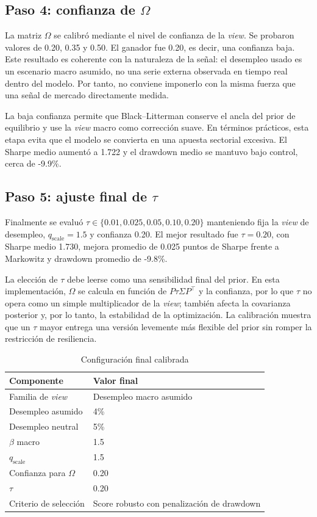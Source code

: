 \documentclass[11pt]{article}
\begin{document}
\subsection{Paso 4: confianza de $\Omega$}

La matriz $\Omega$ se calibr\'o mediante el nivel de confianza de la \textit{view}. Se probaron valores de 0.20, 0.35 y 0.50. El ganador fue 0.20, es decir, una confianza baja. Este resultado es coherente con la naturaleza de la se\~nal: el desempleo usado es un escenario macro asumido, no una serie externa observada en tiempo real dentro del modelo. Por tanto, no conviene imponerlo con la misma fuerza que una se\~nal de mercado directamente medida.

La baja confianza permite que Black--Litterman conserve el ancla del prior de equilibrio y use la \textit{view} macro como correcci\'on suave. En t\'erminos pr\'acticos, esta etapa evita que el modelo se convierta en una apuesta sectorial excesiva. El Sharpe medio aument\'o a 1.722 y el drawdown medio se mantuvo bajo control, cerca de -9.9\%.

\subsection{Paso 5: ajuste final de $\tau$}

Finalmente se evalu\'o $\tau \in \{0.01,0.025,0.05,0.10,0.20\}$ manteniendo fija la \textit{view} de desempleo, $q_{\text{scale}}=1.5$ y confianza 0.20. El mejor resultado fue $\tau=0.20$, con Sharpe medio 1.730, mejora promedio de 0.025 puntos de Sharpe frente a Markowitz y drawdown promedio de -9.8\%.

La elecci\'on de $\tau$ debe leerse como una sensibilidad final del prior. En esta implementaci\'on, $\Omega$ se calcula en funci\'on de $P\tau\Sigma P^\top$ y la confianza, por lo que $\tau$ no opera como un simple multiplicador de la \textit{view}; tambi\'en afecta la covarianza posterior y, por lo tanto, la estabilidad de la optimizaci\'on. La calibraci\'on muestra que un $\tau$ mayor entrega una versi\'on levemente m\'as flexible del prior sin romper la restricci\'on de resiliencia.

\begin{table}[H]
\centering
\caption{Configuraci\'on final calibrada}
\label{tab:config_final}
\begin{tabular}{l l}
\toprule
Componente & Valor final \\
\midrule
Familia de \textit{view} & Desempleo macro asumido \\
Desempleo asumido & 4\% \\
Desempleo neutral & 5\% \\
$\beta$ macro & 1.5 \\
$q_{\text{scale}}$ & 1.5 \\
Confianza para $\Omega$ & 0.20 \\
$\tau$ & 0.20 \\
Criterio de selecci\'on & Score robusto con penalizaci\'on de drawdown \\
\bottomrule
\end{tabular}
\end{table}
\end{document}
